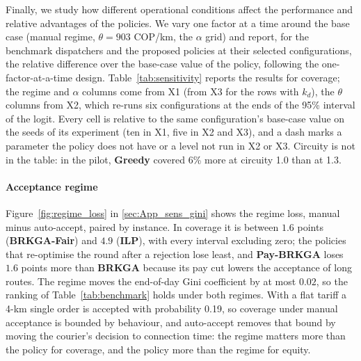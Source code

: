 \documentclass[a4paper,11pt,review,3p,authoryear]{elsarticle}
\begin{document}
Finally, we study how different operational conditions affect the performance and relative advantages of the policies. We vary one factor at a time around the base case (manual regime, $\theta = 903$ COP/km, the $\alpha$ grid) and report, for the benchmark dispatchers and the proposed policies at their selected configurations, the relative difference over the base-case value of the policy, following the one-factor-at-a-time design. Table~\ref{tab:sensitivity} reports the results for coverage; the regime and $\alpha$ columns come from X1 (from X3 for the rows with $k_d$), the $\theta$ columns from X2, which re-runs six configurations at the ends of the 95\% interval of the logit. Every cell is relative to the same configuration's base-case value on the seeds of its experiment (ten in X1, five in X2 and X3), and a dash marks a parameter the policy does not have or a level not run in X2 or X3. Circuity is not in the table: in the pilot, \textbf{Greedy} covered 6\% more at circuity 1.0 than at 1.3.

\paragraph{Acceptance regime} Figure~\ref{fig:regime_loss} in \ref{sec:App_sens_gini} shows the regime loss, manual minus auto-accept, paired by instance. In coverage it is between $1.6$ points (\textbf{BRKGA-Fair}) and $4.9$ (\textbf{ILP}), with every interval excluding zero; the policies that re-optimise the round after a rejection lose least, and \textbf{Pay-BRKGA} loses $1.6$ points more than \textbf{BRKGA} because its pay cut lowers the acceptance of long routes. The regime moves the end-of-day Gini coefficient by at most $0.02$, so the ranking of Table~\ref{tab:benchmark} holds under both regimes. With a flat tariff a 4-km single order is accepted with probability 0.19, so coverage under manual acceptance is bounded by behaviour, and auto-accept removes that bound by moving the courier's decision to connection time: the regime matters more than the policy for coverage, and the policy more than the regime for equity.
\end{document}
